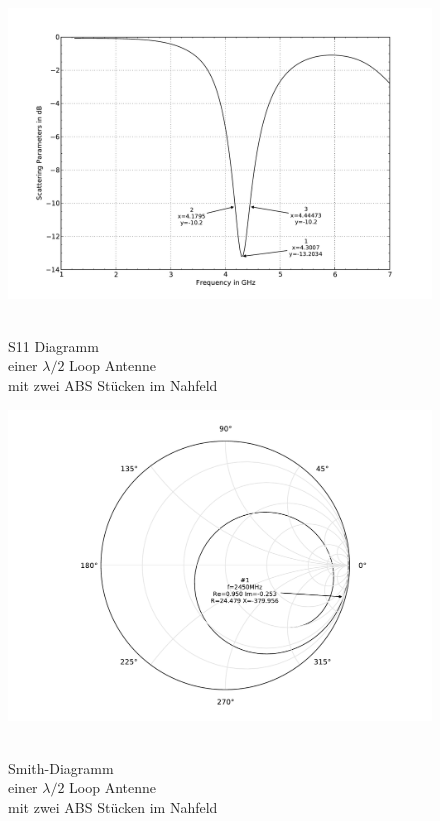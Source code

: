 \begin{figure}[!ht]
	\begin{center}
 	\includegraphics[width=\linewidth]{content/bilder/Evaluation/Loop/L2/2ABS/S11_Loop_Lambda2_mit2ABS.pdf}
  	\caption{\\S11 Diagramm \\einer $\lambda/2$ Loop Antenne \\mit zwei ABS Stücken im Nahfeld}				\label{fig:S11_Lambda2_Loop_2ABS_5}
\endminipage%
 	\includegraphics[width=\linewidth]{content/bilder/Evaluation/Loop/L2/2ABS/Smith_Loop_Lambda2_mit2ABS.pdf}
  	\caption{\\Smith-Diagramm \\einer $\lambda/2$ Loop Antenne \\ mit zwei ABS Stücken im Nahfeld}		\label{fig:Smith_Lambda2_Loop_2ABS_6}
	\endminipage
	\end{center}
\end{figure}
